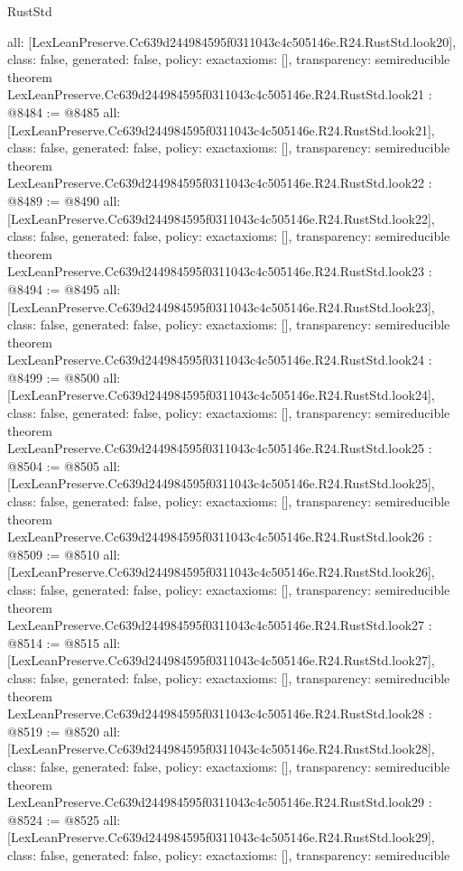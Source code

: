 \begin{lexlean}{RustStd}
\begin{coremodule}
{  all: [LexLeanPreserve.Cc639d244984595f0311043c4c505146e.R24.RustStd.look20],
  class: false,
  generated: false,
  policy: exact{axioms: []},
  transparency: semireducible
}
theorem LexLeanPreserve.Cc639d244984595f0311043c4c505146e.R24.RustStd.look21 : @8484 := @8485 {
  all: [LexLeanPreserve.Cc639d244984595f0311043c4c505146e.R24.RustStd.look21],
  class: false,
  generated: false,
  policy: exact{axioms: []},
  transparency: semireducible
}
theorem LexLeanPreserve.Cc639d244984595f0311043c4c505146e.R24.RustStd.look22 : @8489 := @8490 {
  all: [LexLeanPreserve.Cc639d244984595f0311043c4c505146e.R24.RustStd.look22],
  class: false,
  generated: false,
  policy: exact{axioms: []},
  transparency: semireducible
}
theorem LexLeanPreserve.Cc639d244984595f0311043c4c505146e.R24.RustStd.look23 : @8494 := @8495 {
  all: [LexLeanPreserve.Cc639d244984595f0311043c4c505146e.R24.RustStd.look23],
  class: false,
  generated: false,
  policy: exact{axioms: []},
  transparency: semireducible
}
theorem LexLeanPreserve.Cc639d244984595f0311043c4c505146e.R24.RustStd.look24 : @8499 := @8500 {
  all: [LexLeanPreserve.Cc639d244984595f0311043c4c505146e.R24.RustStd.look24],
  class: false,
  generated: false,
  policy: exact{axioms: []},
  transparency: semireducible
}
theorem LexLeanPreserve.Cc639d244984595f0311043c4c505146e.R24.RustStd.look25 : @8504 := @8505 {
  all: [LexLeanPreserve.Cc639d244984595f0311043c4c505146e.R24.RustStd.look25],
  class: false,
  generated: false,
  policy: exact{axioms: []},
  transparency: semireducible
}
theorem LexLeanPreserve.Cc639d244984595f0311043c4c505146e.R24.RustStd.look26 : @8509 := @8510 {
  all: [LexLeanPreserve.Cc639d244984595f0311043c4c505146e.R24.RustStd.look26],
  class: false,
  generated: false,
  policy: exact{axioms: []},
  transparency: semireducible
}
theorem LexLeanPreserve.Cc639d244984595f0311043c4c505146e.R24.RustStd.look27 : @8514 := @8515 {
  all: [LexLeanPreserve.Cc639d244984595f0311043c4c505146e.R24.RustStd.look27],
  class: false,
  generated: false,
  policy: exact{axioms: []},
  transparency: semireducible
}
theorem LexLeanPreserve.Cc639d244984595f0311043c4c505146e.R24.RustStd.look28 : @8519 := @8520 {
  all: [LexLeanPreserve.Cc639d244984595f0311043c4c505146e.R24.RustStd.look28],
  class: false,
  generated: false,
  policy: exact{axioms: []},
  transparency: semireducible
}
theorem LexLeanPreserve.Cc639d244984595f0311043c4c505146e.R24.RustStd.look29 : @8524 := @8525 {
  all: [LexLeanPreserve.Cc639d244984595f0311043c4c505146e.R24.RustStd.look29],
  class: false,
  generated: false,
  policy: exact{axioms: []},
  transparency: semireducible
}
\end{coremodule}
\end{lexlean}
